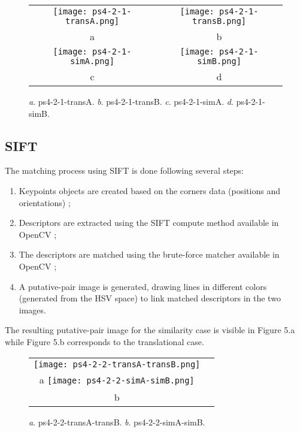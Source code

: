 \documentclass[a4paper,11pt]{article}
\begin{document}
 \begin{figure}[H]
\begin{center}
\begin{tabular}{cc}
	\texttt{[image: ps4-2-1-transA.png]}&
	\texttt{[image: ps4-2-1-transB.png]}\\
	a&b\\
	\texttt{[image: ps4-2-1-simA.png]}&
	\texttt{[image: ps4-2-1-simB.png]}\\
	c&d
\end{tabular}
\end{center}
\caption{ 
\textit{a}. ps4-2-1-transA.  \textit{b}. ps4-2-1-transB. \textit{c}. ps4-2-1-simA.  \textit{d}. ps4-2-1-simB.  }
\label{ps-4-2-1}
\end{figure}

\lstset{style=mystyle}



\subsection{SIFT}

The matching process using SIFT is done following several steps:
\begin{enumerate}
\item Keypoints objects are created based on the corners data (positions and orientations) ;
\item Descriptors are extracted using the SIFT compute method available in OpenCV ;
\item The descriptors are matched using the brute-force matcher available in OpenCV ;
\item A putative-pair image is generated, drawing lines in different colors (generated from the HSV space) to link matched descriptors in the two images.
\end{enumerate}
The resulting putative-pair image for the similarity case is visible in Figure 5.a while Figure 5.b corresponds to the translational case.

 \begin{figure}[H]
\begin{center}
\begin{tabular}{cc}
	\texttt{[image: ps4-2-2-transA-transB.png]}\\
	a
	\texttt{[image: ps4-2-2-simA-simB.png]}\\
	b
\end{tabular}
\end{center}
\caption{ 
\textit{a}. ps4-2-2-transA-transB.  \textit{b}. ps4-2-2-simA-simB.  }
\label{ps-4-2-2}
\end{figure}
\end{document}
